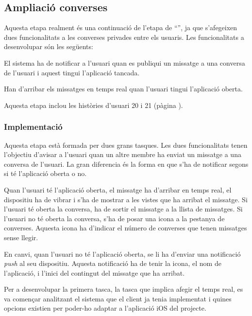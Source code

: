 \subsection{Ampliació converses}

Aquesta etapa realment és una continuació de l'etapa de ``'', ja que s'afegeixen dues funcionalitats a les converses privades entre els usuaris. Les funcionalitats a desenvolupar són les següents:

\begin{compactitem}
    \item El sistema ha de notificar a l'usuari quan es publiqui un missatge a una conversa de l'usuari i aquest tingui l'aplicació tancada.
    \item Han d'arribar els missatges en temps real quan l'usuari tingui l'aplicació oberta.
\end{compactitem}

Aquesta etapa inclou les històries d'usuari 20 i 21 (pàgina \pageref{sec:historia_20}).

\subsubsection{Implementació}

Aquesta etapa està formada per dues grans tasques. Les dues funcionalitats tenen l'objectiu d'avisar a l'usuari quan un altre membre ha enviat un missatge a una conversa de l'usuari. La gran diferencia és la forma en que s'ha de notificar segons si té l'aplicació oberta o no.

Quan l'usuari té l'aplicació oberta, el missatge ha d'arribar en temps real, el dispositiu ha de vibrar i s'ha de mostrar a les vistes que ha arribat el missatge. Si l'usuari té oberta la conversa, ha de sortir el missatge a la llista de missatges. Si l'usuari no té oberta la conversa, s'ha de posar una icona a la pestanya de converses. Aquesta icona ha d'indicar el número de converses que tenen missatges sense llegir.

En canvi, quan l'usuari no té l'aplicació oberta, se li ha d'enviar una notificació \textit{push} al seu dispositiu. Aquesta notificació ha de tenir la icona, el nom de l'aplicació, i l'inici del contingut del missatge que ha arribat.

Per a desenvolupar la primera tasca, la tasca que implica afegir el temps real, es va començar analitzant el sistema que el client ja tenia implementat i quines opcions existien per poder-ho adaptar a l'aplicació iOS del projecte.

